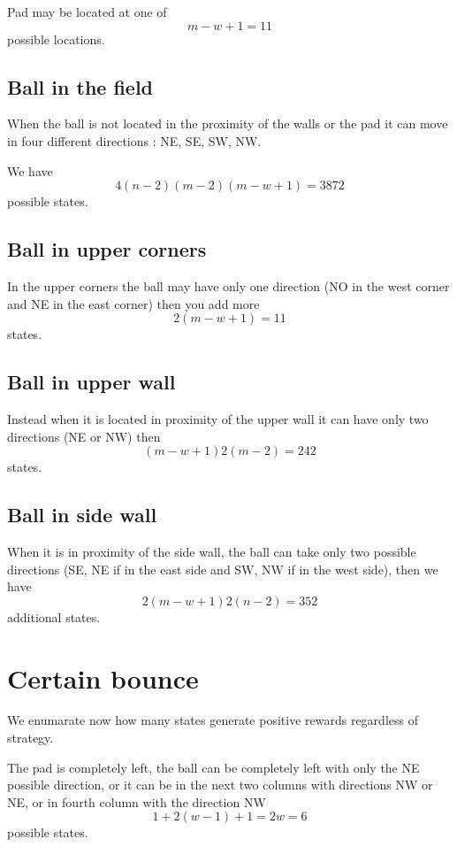 \documentclass[a4paper,11pt]{article}
\begin{document}
Pad may be located at one of \[m - w + 1 = 11 \] possible locations.

\subsection{Ball in the field}

When the ball is not located in the proximity of the walls or the pad
it can move in four different directions : NE, SE, SW, NW.

We have
\[ 4 (n-2)(m-2) (m - w + 1) = 3872 \]
possible states.

\subsection{Ball in upper corners}

In the upper corners the ball may have only one direction (NO in the west corner and NE in the east corner) then
you add more
\[
	2 (m - w +1) = 11
\] states.

\subsection{Ball in upper wall}

Instead when it is located in proximity of the upper wall it can have only two directions (NE or NW) then
\[
	( m - w + 1 ) 2 ( m - 2 ) = 242
\]
states.

\subsection{Ball in side wall}

When it is in proximity of the side wall, the ball can take only two possible directions (SE, NE if in the east side and SW, NW if in the west side), then we have
 \[ 2 (m - w + 1) 2 (n - 2) = 352 \]
additional states.


\section{Certain bounce}

We enumarate now how many states generate positive rewards regardless of strategy.

The pad is completely left, the ball can be completely left with only the NE possible direction, or it can be in the next two columns with directions NW or NE, or in fourth column with the direction NW
\[ 1 + 2(w-1) + 1 = 2w =  6 \]
possible states.
\end{document}
